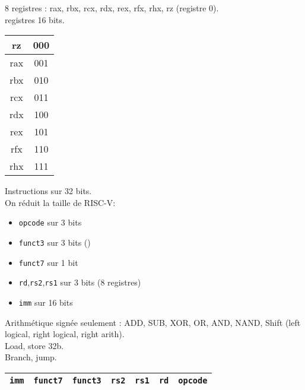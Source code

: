 \documentclass[a4paper]{article}
\begin{document}
    8 registres : rax, rbx, rcx, rdx, rex, rfx, rhx, rz (registre 0).\\
    registres 16 bits.\\
    \begin{tabular}{|c|c|}
        \hline
        rz  & 000\\
        \hline
        rax & 001\\
        \hline
        rbx & 010\\
        \hline
        rcx & 011\\
        \hline
        rdx & 100\\
        \hline 
        rex & 101\\
        \hline 
        rfx & 110\\
        \hline
        rhx & 111\\
        \hline  
    \end{tabular}

    Instructions sur 32 bits.\\
    On réduit la taille de RISC-V:\begin{itemize}
        \item \texttt{opcode} sur 3 bits
        \item \texttt{funct3} sur 3 bits ()
        \item \texttt{funct7} sur 1 bit 
        \item \texttt{rd},\texttt{rs2},\texttt{rs1} sur 3 bits (8 registres)
        \item \texttt{imm} sur 16 bits
    \end{itemize}
    Arithmétique signée seulement : ADD, SUB, XOR, OR, AND, NAND, Shift (left logical, right logical, right arith).\\
    Load, store 32b.\\
    Branch, jump.

    \begin{tabular}{|c|c|c|c|c|c|c|}
        \hline
        \texttt{imm} & \texttt{funct7} & \texttt{funct3} & \texttt{rs2} & \texttt{rs1} & \texttt{rd} & \texttt{opcode} \\
        \hline
    \end{tabular}
\end{document}
